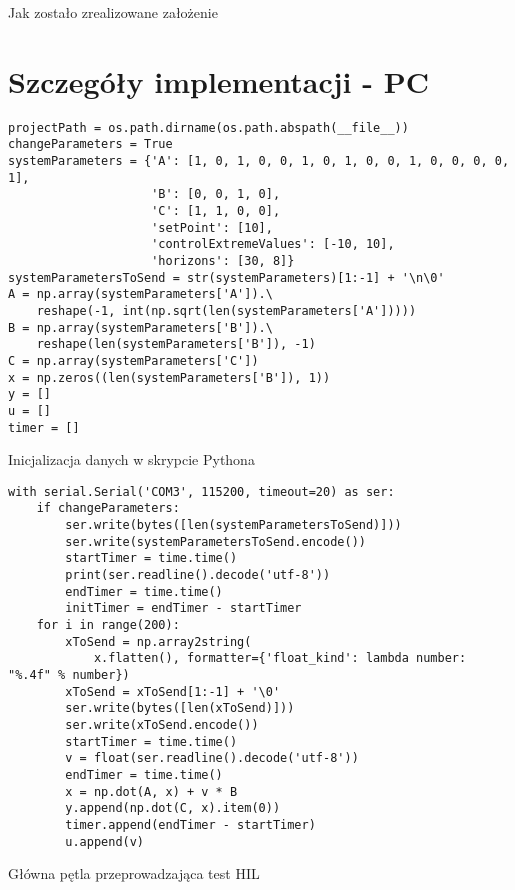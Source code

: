 Jak zostało zrealizowane założenie

\section{Szczegóły implementacji - PC} \label{sec:details-pc}
\begin{listing}[htb]
\begin{verbatim}
projectPath = os.path.dirname(os.path.abspath(__file__))
changeParameters = True
systemParameters = {'A': [1, 0, 1, 0, 0, 1, 0, 1, 0, 0, 1, 0, 0, 0, 0, 1],
                    'B': [0, 0, 1, 0],
                    'C': [1, 1, 0, 0],
                    'setPoint': [10],
                    'controlExtremeValues': [-10, 10],
                    'horizons': [30, 8]}
systemParametersToSend = str(systemParameters)[1:-1] + '\n\0'
A = np.array(systemParameters['A']).\
    reshape(-1, int(np.sqrt(len(systemParameters['A']))))
B = np.array(systemParameters['B']).\
    reshape(len(systemParameters['B']), -1)
C = np.array(systemParameters['C'])
x = np.zeros((len(systemParameters['B']), 1))
y = []
u = []
timer = []
\end{verbatim}
\caption{Inicjalizacja danych w skrypcie Pythona}
\label{lst:init_py}
\end{listing}

\begin{listing}[htb]
\begin{verbatim}
with serial.Serial('COM3', 115200, timeout=20) as ser:
    if changeParameters:
        ser.write(bytes([len(systemParametersToSend)]))
        ser.write(systemParametersToSend.encode())
        startTimer = time.time()
        print(ser.readline().decode('utf-8'))
        endTimer = time.time()
        initTimer = endTimer - startTimer
    for i in range(200):
        xToSend = np.array2string(
            x.flatten(), formatter={'float_kind': lambda number: "%.4f" % number})
        xToSend = xToSend[1:-1] + '\0'
        ser.write(bytes([len(xToSend)]))
        ser.write(xToSend.encode())
        startTimer = time.time()
        v = float(ser.readline().decode('utf-8'))
        endTimer = time.time()
        x = np.dot(A, x) + v * B
        y.append(np.dot(C, x).item(0))
        timer.append(endTimer - startTimer)
        u.append(v)
\end{verbatim}
\caption{Główna pętla przeprowadzająca test HIL}
\label{lst:serial_py}
\end{listing}

